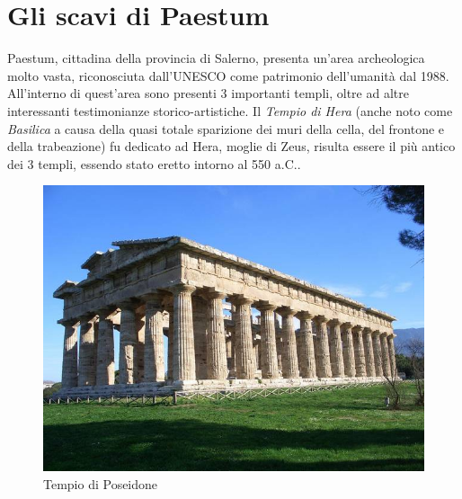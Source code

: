 \section{Gli scavi di Paestum}
Paestum, cittadina della provincia di Salerno, presenta un'area archeologica molto vasta, riconosciuta dall'UNESCO come patrimonio dell'umanità dal 1988.
All'interno di quest'area sono presenti 3 importanti templi, oltre ad altre interessanti testimonianze storico-artistiche. Il \emph{Tempio di Hera} (anche noto come \emph{Basilica} a causa della quasi totale sparizione dei muri della cella, del frontone e della trabeazione) fu dedicato ad Hera, moglie di Zeus, risulta essere il più antico dei 3 templi, essendo stato eretto intorno al 550 a.C.. 
\begin{figure}[h!]
\begin{center}
\includegraphics[scale=0.7]{imgs/tempioposeidone.jpg} 
\caption{Tempio di Poseidone\label{tempioposeidone}}
\end{center}
\end{figure}
